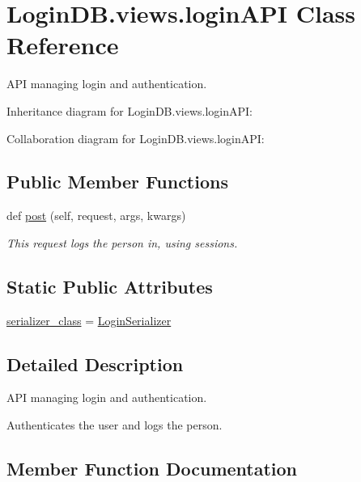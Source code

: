 \hypertarget{class_login_d_b_1_1views_1_1login_a_p_i}{}\section{Login\+D\+B.\+views.\+login\+A\+PI Class Reference}
\label{class_login_d_b_1_1views_1_1login_a_p_i}


A\+PI managing login and authentication.  




Inheritance diagram for Login\+D\+B.\+views.\+login\+A\+PI\+:


Collaboration diagram for Login\+D\+B.\+views.\+login\+A\+PI\+:
\subsection*{Public Member Functions}
\begin{DoxyCompactItemize}
\item 
def \hyperlink{class_login_d_b_1_1views_1_1login_a_p_i_a21ab22165c43f31240a56e65be314a31}{post} (self, request, args, kwargs)
\begin{DoxyCompactList}\small\item\em This request logs the person in, using sessions. \end{DoxyCompactList}\end{DoxyCompactItemize}
\subsection*{Static Public Attributes}
\begin{DoxyCompactItemize}
\item 
\hyperlink{class_login_d_b_1_1views_1_1login_a_p_i_a8aae9e202c7bb594023abc92454c4ca5}{serializer\+\_\+class} = \hyperlink{class_login_d_b_1_1serializers_1_1_login_serializer}{Login\+Serializer}
\end{DoxyCompactItemize}


\subsection{Detailed Description}
A\+PI managing login and authentication. 

\begin{DoxyVerb}Authenticates the user and logs the person.
\end{DoxyVerb}
 

\subsection{Member Function Documentation}
\mbox{\label{class_login_d_b_1_1views_1_1login_a_p_i_a21ab22165c43f31240a56e65be314a31}} 
